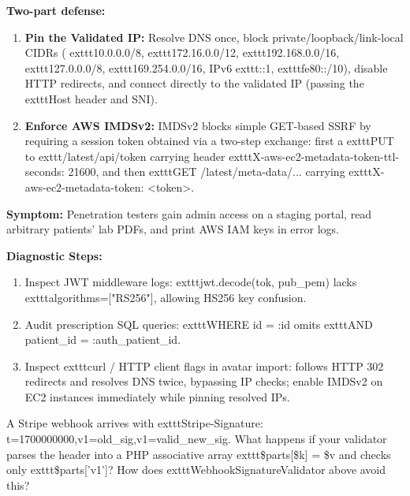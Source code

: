 \textbf{Two-part defense:}
\begin{enumerate}[leftmargin=15pt]
  \item \textbf{Pin the Validated IP:} Resolve DNS once, block private/loopback/link-local CIDRs (	exttt{10.0.0.0/8}, 	exttt{172.16.0.0/12}, 	exttt{192.168.0.0/16}, 	exttt{127.0.0.0/8}, 	exttt{169.254.0.0/16}, IPv6 	exttt{::1}, 	exttt{fe80::/10}), disable HTTP redirects, and connect directly to the validated IP (passing the 	exttt{Host} header and SNI).
  \item \textbf{Enforce AWS IMDSv2:} IMDSv2 blocks simple GET-based SSRF by requiring a session token obtained via a two-step exchange: first a 	exttt{PUT} to 	exttt{/latest/api/token} carrying header 	exttt{X-aws-ec2-metadata-token-ttl-seconds: 21600}, and then 	exttt{GET /latest/meta-data/...} carrying 	exttt{X-aws-ec2-metadata-token: <token>}.
\end{enumerate}

\begin{realworldbox}
\textbf{Symptom:} Penetration testers gain admin access on a staging portal, read arbitrary patients' lab PDFs, and print AWS IAM keys in error logs.

\textbf{Diagnostic Steps:}
\begin{enumerate}[leftmargin=15pt,itemsep=2pt]
  \item Inspect JWT middleware logs: 	exttt{jwt.decode(tok, pub\_pem)} lacks 	exttt{algorithms=["RS256"]}, allowing HS256 key confusion.
  \item Audit prescription SQL queries: 	exttt{WHERE id = :id} omits 	exttt{AND patient\_id = :auth\_patient\_id}.
  \item Inspect 	exttt{curl} / HTTP client flags in avatar import: follows HTTP 302 redirects and resolves DNS twice, bypassing IP checks; enable IMDSv2 on EC2 instances immediately while pinning resolved IPs.
\end{enumerate}
\end{realworldbox}

\begin{tryityourselfbox}
A Stripe webhook arrives with 	exttt{Stripe-Signature: t=1700000000,v1=old\_sig,v1=valid\_new\_sig}. What happens if your validator parses the header into a PHP associative array 	exttt{\$parts[\$k] = \$v} and checks only 	exttt{\$parts['v1']}? How does 	exttt{WebhookSignatureValidator} above avoid this?
\end{tryityourselfbox}

